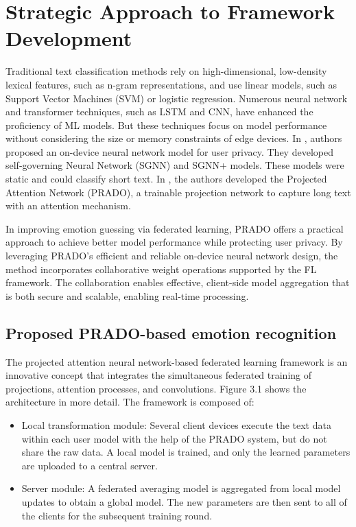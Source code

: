 \section{Strategic Approach to Framework Development}
Traditional text classification methods rely on high-dimensional, low-density lexical features, such as n-gram representations, and use linear models, such as Support Vector Machines (SVM) or logistic regression. Numerous neural network and transformer techniques, such as LSTM and CNN, have enhanced the proficiency of ML models. But these techniques focus on model performance without considering the size or memory constraints of edge devices. In \cite{ref76}, authors proposed an on-device neural network model for user privacy. They developed self-governing Neural Network (SGNN) and SGNN+ models. These models were static and could classify short text. In \cite{ref75} , the authors developed the Projected Attention Network (PRADO), a trainable projection network to capture long text with an attention mechanism.

In improving emotion guessing via federated learning, PRADO offers a practical approach to achieve better model performance while protecting user privacy. By leveraging PRADO's efficient and reliable on-device neural network design, the method incorporates collaborative weight operations supported by the FL framework. The collaboration enables effective, client-side model aggregation that is both secure and scalable, enabling real-time processing.

\subsection{Proposed PRADO-based emotion recognition}
The projected attention neural network-based federated learning framework is an innovative concept that integrates the simultaneous federated training of projections, attention processes, and convolutions. Figure 3.1 shows the architecture in more detail. The framework is composed of:

\begin{itemize}
    \item Local transformation module: Several client devices execute the text data within each user model with the help of the PRADO system, but do not share the raw data. A local model is trained, and only the learned parameters are uploaded to a central server.
    \item Server module: A federated averaging model is aggregated from local model updates to obtain a global model. The new parameters are then sent to all of the clients for the subsequent training round.
\end{itemize}

